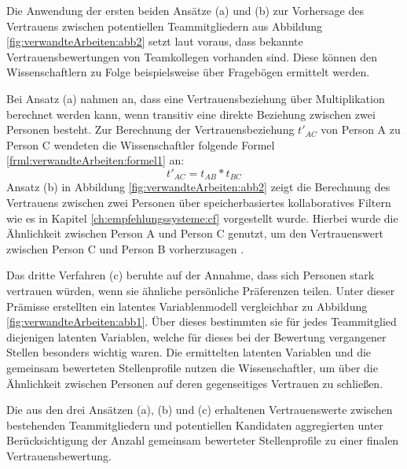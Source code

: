 Die Anwendung der ersten beiden Ansätze (a) und (b) zur Vorhersage des Vertrauens zwischen potentiellen Teammitgliedern aus Abbildung \ref{fig:verwandteArbeiten:abb2} setzt laut \textcite[S. 4ff.]{malinowski:2005} voraus, dass bekannte Vertrauensbewertungen von Teamkollegen vorhanden sind. Diese können den Wissenschaftlern zu Folge beispielsweise über Fragebögen ermittelt werden.

Bei Ansatz (a) nahmen \textcite[S. 5f.]{malinowski:2005} an, dass eine Vertrauensbeziehung über Multiplikation berechnet werden kann, wenn transitiv eine direkte Beziehung zwischen zwei Personen besteht. Zur Berechnung der Vertrauensbeziehung $t'_{AC}$ von Person A zu Person C wendeten die Wissenschaftler folgende Formel \ref{frml:verwandteArbeiten:formel1} an:
\begin{equation}
	t'_{AC} = t_{AB} * t_{BC}
	\label{frml:verwandteArbeiten:formel1}
\end{equation}
Ansatz (b) in Abbildung \ref{fig:verwandteArbeiten:abb2} zeigt die Berechnung des Vertrauens zwischen zwei Personen über speicherbasiertes kollaboratives Filtern wie es in Kapitel \ref{ch:empfehlungssysteme:cf} vorgestellt wurde. Hierbei wurde die Ähnlichkeit zwischen Person A und Person C genutzt, um den Vertrauenswert zwischen Person C und Person B vorherzusagen \cite[S. 6]{malinowski:2005}.

Das dritte Verfahren (c) beruhte auf der Annahme, dass sich Personen stark vertrauen würden, wenn sie ähnliche persönliche Präferenzen teilen. Unter dieser Prämisse erstellten \textcite[S. 6f.]{malinowski:2005} ein latentes Variablenmodell vergleichbar zu Abbildung \ref{fig:verwandteArbeiten:abb1}. Über dieses bestimmten sie für jedes Teammitglied diejenigen latenten Variablen, welche für dieses bei der Bewertung vergangener Stellen besonders wichtig waren. Die ermittelten latenten Variablen und die gemeinsam bewerteten Stellenprofile nutzen die Wissenschaftler, um über die Ähnlichkeit zwischen Personen auf deren gegenseitiges Vertrauen zu schließen.

Die aus den drei Ansätzen (a), (b) und (c) erhaltenen Vertrauenswerte zwischen bestehenden Teammitgliedern und potentiellen Kandidaten aggregierten \textcite[S. 7ff.]{malinowski:2005} unter Berücksichtigung der Anzahl gemeinsam bewerteter Stellenprofile zu einer finalen Vertrauensbewertung.

